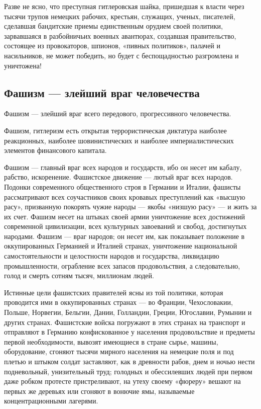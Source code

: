 \documentclass[12pt, a4paper, openany]{book}
\begin{document}
Разве не ясно, что преступная гитлеровская шайка, пришедшая к власти через тысячи трупов немецких рабочих, крестьян, служащих, ученых, писателей, сделавшая бандитские приемы единственным орудием своей политики, зарвавшаяся в разбойничьих военных авантюрах, создавшая правительство, состоящее из провокаторов, шпионов, «пивных политиков», палачей и насильников, не может победить, но будет с беспощадностью разгромлена и уничтожена!

	\subsection*{\center \textbf{Фашизм --- злейший враг человечества}}


Фашизм — злейший враг всего передового, прогрессивного человечества.

Фашизм, гитлеризм есть открытая террористическая диктатура наиболее реакционных, наиболее шовинистических и наиболее империалистических элементов финансового капитала.

Фашизм — главный враг всех народов и государств, ибо он несет им кабалу, рабство, искоренение. Фашистское движение — лютый враг всех народов. Подонки современного общественного строя в Германии и Италии, фашисты рассматривают всех соучастников своих кровавых преступлений как «высшую расу», призванную покорять чужие народы — якобы «низшую расу» — и жить за их счет. Фашизм несет на штыках своей армии уничтожение всех достижений современной цивилизации, всех культурных завоеваний и свобод, достигнутых народами. Фашизм — враг народов; он несет им, как показывает положение в оккупированных Германией и Италией странах, уничтожение национальной самостоятельности и целостности народов и государства, ликвидацию промышленности, ограбление всех запасов продовольствия, а следовательно, голод и смерть сотням тысяч, миллионам людей.

Истинные цели фашистских правителей ясны из той политики, которая проводится ими в оккупированных странах — во Франции, Чехословакии, Польше, Норвегии, Бельгии, Дании, Голландии, Греции, Югославии, Румынии и других странах. Фашистские войска погружают в этих странах на транспорт и отправляют в Германию конфискованное у населения продовольствие и предметы первой необходимости, вывозят имеющиеся в стране сырье, машины, оборудование, сгоняют тысячи мирного населения на немецкие поля и под плетью и штыком солдат заставляют, как в древности рабов, днем и ночью нести подневольный, унизительный труд; голодных и обессилевших людей при первом даже робком протесте пристреливают, на утеху своему «фюреру» вешают на первых же деревьях или сгоняют в вонючие ямы, называемые концентрационными лагерями.
\end{document}
